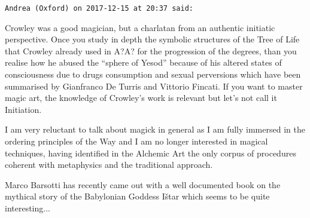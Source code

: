 \begin{footnotesize}
\begin{sffamily}
\hfill

\texttt{Andrea (Oxford) on 2017-12-15 at 20:37 said:}

Crowley was a good magician, but a charlatan from an authentic initiatic perspective. Once you study in depth the symbolic structures of the Tree of Life that Crowley already used in A?A? for the progression of the degrees, than you realise how he abused the ``sphere of Yesod'' because of his altered states of consciousness due to drugs consumption and sexual perversions which have been summarised by Gianfranco De Turris and Vittorio Fincati. If you want to master magic art, the knowledge of Crowley's work is relevant but let's not call it Initiation.

I am very reluctant to talk about magick in general as I am fully immersed in the ordering principles of the Way and I am no longer interested in magical techniques, having identified in the Alchemic Art the only corpus of procedures coherent with metaphysics and the traditional approach.

Marco Barsotti has recently came out with a well documented book on the mythical story of the Babylonian Goddess Ištar which seems to be quite interesting... \hfill

\end{sffamily}
\end{footnotesize}

